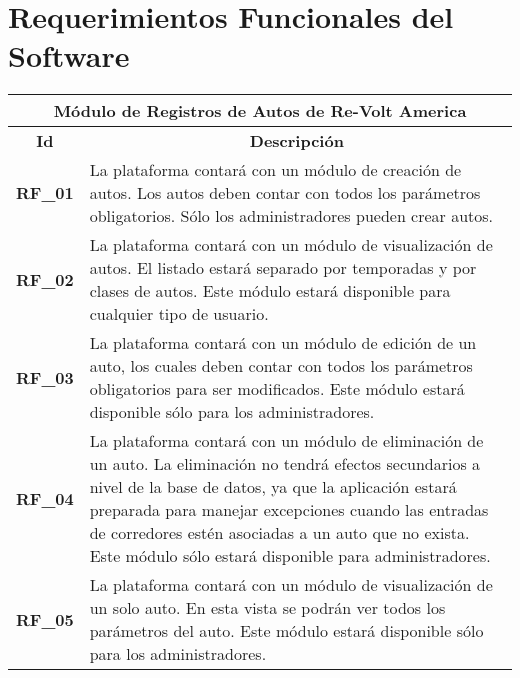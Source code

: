 \section{Requerimientos Funcionales del Software}

\begin{center}
	\begin{tabular}{ | l | p{15cm} |}
		\hline
		\multicolumn{2}{|c|}{\textbf{Módulo de Registros de Autos de Re-Volt America}} \\
		\hline
		\multicolumn{1}{|c|}{\textbf{Id}} & \multicolumn{1}{|c|}{\textbf{Descripción}} \\
		\hline
		{\textbf{RF\_01}} & La plataforma contará con un módulo de creación de autos. Los autos deben contar con todos los parámetros obligatorios. Sólo los administradores pueden crear autos. \\ \hline

		{\textbf{RF\_02}} & La plataforma contará con un módulo de visualización de autos. El listado estará separado por temporadas y por clases de autos. Este módulo estará disponible para cualquier tipo de usuario. \\ \hline

		{\textbf{RF\_03}} & La plataforma contará con un módulo de edición de un auto, los cuales deben contar con todos los parámetros obligatorios para ser modificados. Este módulo estará disponible sólo para los administradores. \\ \hline
		
		{\textbf{RF\_04}} & La plataforma contará con un módulo de eliminación de un auto. La eliminación no tendrá efectos secundarios a nivel de la base de datos, ya que la aplicación estará preparada para manejar excepciones cuando las entradas de corredores estén asociadas a un auto que no exista. Este módulo sólo estará disponible para administradores. \\ \hline
		
		{\textbf{RF\_05}} & La plataforma contará con un módulo de visualización de un solo auto. En esta vista se podrán ver todos los parámetros del auto. Este módulo estará disponible sólo para los administradores. \\ \hline
	\end{tabular}
\end{center}

